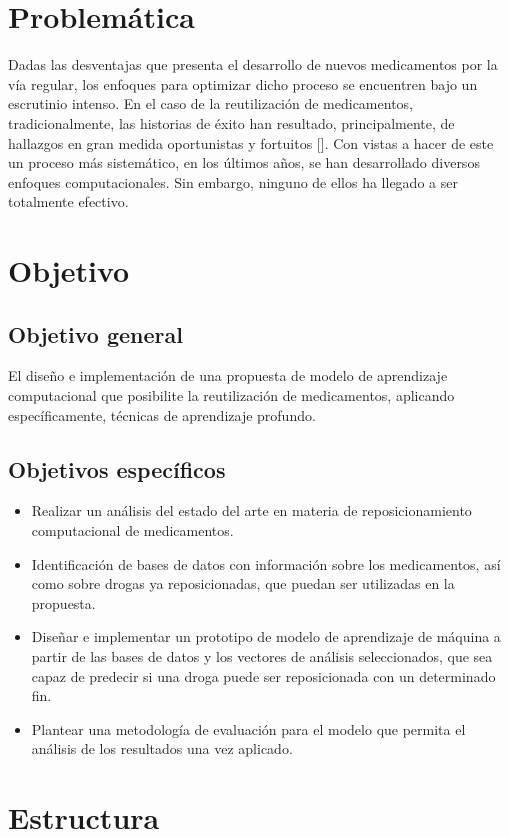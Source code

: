 \section*{Problemática}
Dadas las desventajas que presenta el desarrollo de nuevos medicamentos por la vía regular, los enfoques para optimizar dicho proceso se encuentren bajo un escrutinio intenso. En el caso de la reutilización de medicamentos, tradicionalmente, las historias de éxito han resultado, principalmente, de hallazgos en gran medida oportunistas y fortuitos [\cite{drugfindings}]. Con vistas a hacer de este un proceso más sistemático, en los últimos años, se han desarrollado diversos enfoques computacionales. Sin embargo, ninguno de ellos ha llegado a ser totalmente efectivo. 

\section*{Objetivo}
\subsection*{Objetivo general}
El diseño e implementación de una propuesta de modelo de aprendizaje computacional que posibilite la reutilización de medicamentos, aplicando específicamente, técnicas de aprendizaje profundo. 

\subsection*{Objetivos específicos}

\begin{itemize}
    \item Realizar un análisis del estado del arte en materia de reposicionamiento computacional de medicamentos.
    \item Identificación de bases de datos con información sobre los medicamentos, así como sobre drogas ya reposicionadas, que puedan ser utilizadas en la propuesta.
    \item Diseñar e implementar un prototipo de modelo de aprendizaje de máquina a partir de las bases de datos y los vectores de análisis seleccionados, que sea capaz de predecir si una droga puede ser reposicionada con un determinado fin.
    \item Plantear una metodología de evaluación para el modelo que permita el análisis de los resultados una vez aplicado.
\end{itemize}

\section*{Estructura}